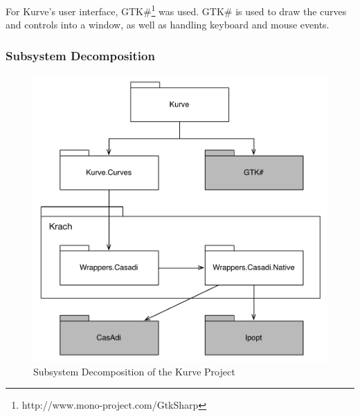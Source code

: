 \documentclass[a4paper]{article}
\begin{document}
				For Kurve's user interface, GTK\#\footnote{http://www.mono-project.com/GtkSharp} was used. GTK\# is used to draw the curves and controls into a window, as well as handling keyboard and mouse events.
				
			\subsubsection{Subsystem Decomposition}	
			
				\begin{figure}[htb]
					\centering
					\includegraphics[width=\textwidth]{../resources/subsystems.pdf}
					\caption{Subsystem Decomposition of the Kurve Project}
					\label{figure:subsystem_decomposition}
				\end{figure}
				
\end{document}
